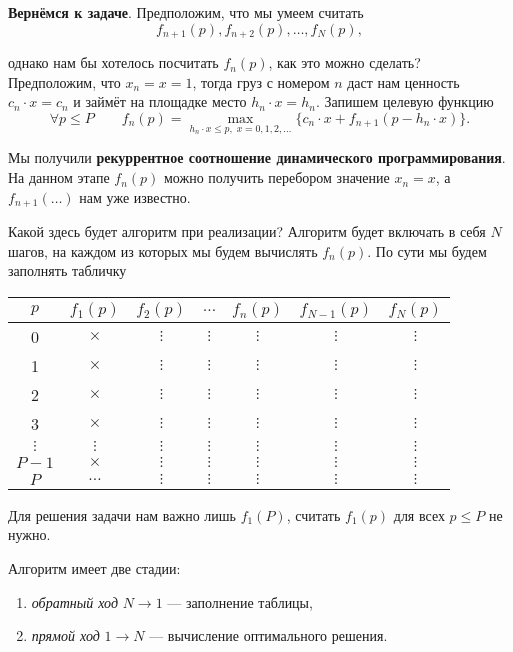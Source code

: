 \textbf{Вернёмся к задаче}. Предположим, что мы умеем считать
\[
f_{n+1}(p), f_{n+2}(p), \dots, f_{N}(p),
\]

однако нам бы хотелось посчитать $f_n(p)$, как это можно сделать? Предположим, что $x_n = x = 1$, тогда груз с номером $n$ даст нам ценность $c_n \cdot x = c_n$ и займёт на площадке место $h_n \cdot x = h_n$. Запишем целевую функцию
\[
\forall p \le P \qquad f_n(p) = \max_{h_n \cdot x \le p, \; x = 0, 1, 2, \dots} \big\{c_n \cdot x + f_{n+1}(p - h_n \cdot x)\big\}.
\]

Мы получили \textbf{рекуррентное соотношение динамического программирования}. На данном этапе $f_n(p)$ можно получить перебором значение $x_n = x$, а $f_{n+1}(\dots)$ нам уже известно.

Какой здесь будет алгоритм при реализации? Алгоритм будет включать в себя $N$ шагов, на каждом из которых мы будем вычислять $f_n(p)$. По сути мы будем заполнять табличку

\begin{table}[h!]
	\centering
	\begin{tabular}{|c|  c | c | c | c | c| c|} 
		\hline
		$p$ & $f_1(p)$ & $f_2(p)$ & $\dots$ & $f_n(p)$ & $f_{N-1}(p)$ & $f_N(p)$\\ [0.5ex] 
		\hline
		0 & $\times$ & $\vdots$ & $\vdots$ & $\vdots$ & $\vdots$ & $\vdots$ \\ 
		1 & $\times$ & $\vdots$ & $\vdots$ & $\vdots$ & $\vdots$ & $\vdots$ \\
		2 & $\times$ & $\vdots$ & $\vdots$ & $\vdots$ & $\vdots$ & $\vdots$ \\
		3 & $\times$ & $\vdots$ & $\vdots$ & $\vdots$ & $\vdots$ & $\vdots$ \\
		$\vdots$ & $\vdots$ & $\vdots$ & $\vdots$ & $\vdots$ & $\vdots$ & $\vdots$ \\
		$P-1$ & $\times$ & $\vdots$ & $\vdots$ & $\vdots$ & $\vdots$ & $\vdots$ \\
		$P$ & $\dots$ & $\vdots$ & $\vdots$ & $\vdots$ & $\vdots$ & $\vdots$ \\ [1ex] 
		\hline
	\end{tabular}
\end{table}

Для решения задачи нам важно лишь $f_1(P)$, считать $f_1(p)$ для всех $p \le P$ не нужно.

Алгоритм имеет две стадии:
\begin{enumerate}[nosep]
	\item \textit{обратный ход} $N \to 1$ --- заполнение таблицы,
	
	\item \textit{прямой ход} $1 \to N$ --- вычисление оптимального решения.
\end{enumerate}


